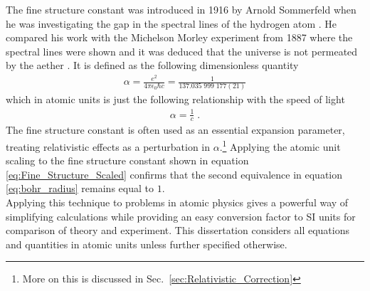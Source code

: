         The fine structure constant was introduced in 1916 by Arnold Sommerfeld when he was investigating the gap in the spectral lines of the hydrogen atom \cite{Sommerfeld_1916}. He compared his work with the Michelson Morley experiment from 1887 where the spectral lines were shown and it was deduced that the universe is not permeated by the aether \cite{Michelson_Morley_1887}. It is defined as the following dimensionless quantity
        \begin{align}
            \alpha = \frac{e^2}{4\pi \epsilon_0 \hbar c} = \frac{1}{137.035\;999\;177(21)}
        \end{align}
        \noindent which in atomic units is just the following relationship with the speed of light 
        \begin{align}
            \alpha = \frac{1}{c} \label{eq:Fine_Structure_Scaled}\;.
        \end{align}
        \noindent The fine structure constant is often used as an essential expansion parameter, treating relativistic effects as a perturbation in $\alpha$.\footnote{More on this is discussed in Sec.~\ref{sec:Relativistic_Correction}} Applying the atomic unit scaling to the fine structure constant shown in equation \eqref{eq:Fine_Structure_Scaled} confirms that the second equivalence in equation \eqref{eq:bohr_radius} remains equal to $1$. \\

        Applying this technique to problems in atomic physics gives a powerful way of simplifying calculations while providing an easy conversion factor to SI units for comparison of theory and experiment. This dissertation considers all equations and quantities in atomic units unless further specified otherwise.


